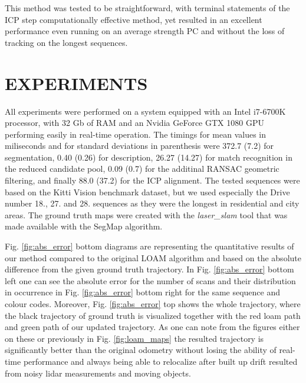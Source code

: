 \documentclass[letterpaper, 10 pt, conference]{ieeeconf}  %
\begin{document}
This method was tested to be straightforward, with terminal statements of the ICP step computationally effective method, yet resulted in an excellent performance even running on an average strength PC and without the loss of tracking on the longest sequences. 

\section{EXPERIMENTS} \label{experiments}

All experiments were performed on a system equipped with
an Intel i7-6700K processor, with 32 Gb of RAM and an Nvidia GeForce GTX 1080 GPU performing easily in real-time operation. 
The timings for mean values in miliseconds and for standard deviations in parenthesis were 372.7 (7.2) for segmentation, 0.40 (0.26) for description, 26.27 (14.27) for match recognition in the reduced candidate pool, 0.09 (0.7) for the additinal RANSAC geometric filtering, and finally 88.0 (37.2) for the ICP alignment. The tested sequences were based on the Kitti Vision benchmark dataset, but we used especially the Drive number 18., 27. and 28. sequences as they were the longest in residential and city areas. The ground truth maps were created with the \textit{laser\_slam} tool that was made available with the SegMap algorithm. 

Fig. \ref{fig:abs_error} bottom diagrams are representing the quantitative results of our method compared to the original LOAM algorithm and based on the absolute difference from the given ground truth trajectory. In Fig. \ref{fig:abs_error} bottom left one can see the absolute error for the number of scans and their distribution in occurrence in Fig. \ref{fig:abs_error} bottom right for the same sequence and colour codes. Moreover, Fig. \ref{fig:abs_error} top shows the whole trajectory, where the black trajectory of ground truth is visualized together with the red loam path and green path of our updated trajectory. As one can note from the figures either on these or previously in Fig. \ref{fig:loam_maps} the resulted trajectory is significantly better than the original odometry without losing the ability of real-time performance and always being able to relocalize after built up drift resulted from noisy lidar measurements and moving objects. 
\end{document}
